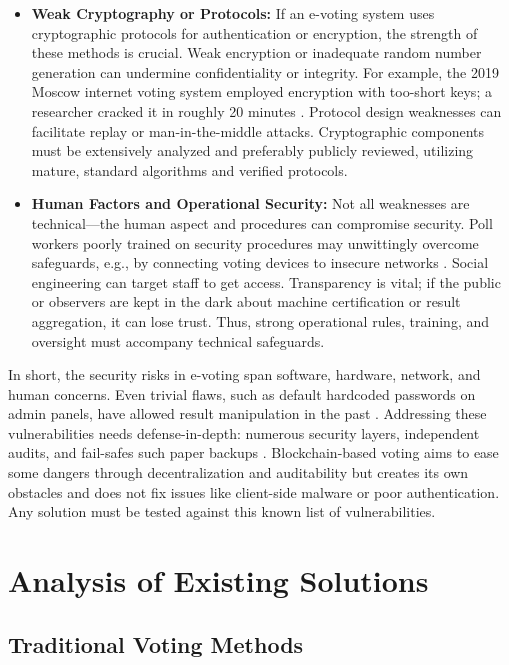 \documentclass[a4paper,10pt]{report}
\begin{document}
\begin{itemize}
     \item \textbf {Weak Cryptography or Protocols:}  If an e-voting system uses cryptographic protocols for authentication or encryption, the strength of these methods is crucial.  Weak encryption or inadequate random number generation can undermine confidentiality or integrity.  For example, the 2019 Moscow internet voting system employed encryption with too-short keys; a researcher cracked it in roughly 20 minutes \cite{moscow2019crypto}.  Protocol design weaknesses can facilitate replay or man-in-the-middle attacks.  Cryptographic components must be extensively analyzed and preferably publicly reviewed, utilizing mature, standard algorithms and verified protocols.
    
     \item \textbf {Human Factors and Operational Security:}  Not all weaknesses are technical—the human aspect and procedures can compromise security.  Poll workers poorly trained on security procedures may unwittingly overcome safeguards, e.g., by connecting voting devices to insecure networks \cite{estonia2017report}.  Social engineering can target staff to get access.  Transparency is vital; if the public or observers are kept in the dark about machine certification or result aggregation, it can lose trust.  Thus, strong operational rules, training, and oversight must accompany technical safeguards.
\end{itemize}

In short, the security risks in e-voting span software, hardware, network, and human concerns.   Even trivial flaws, such as default hardcoded passwords on admin panels, have allowed result manipulation in the past \cite{neumann1996computer}.   Addressing these vulnerabilities needs defense-in-depth: numerous security layers, independent audits, and fail-safes such paper backups \cite{neumann1996computer}.   Blockchain-based voting aims to ease some dangers through decentralization and auditability but creates its own obstacles and does not fix issues like client-side malware or poor authentication.   Any solution must be tested against this known list of vulnerabilities.

\chapter{Analysis of Existing Solutions}

\section{Traditional Voting Methods}
\end{document}
